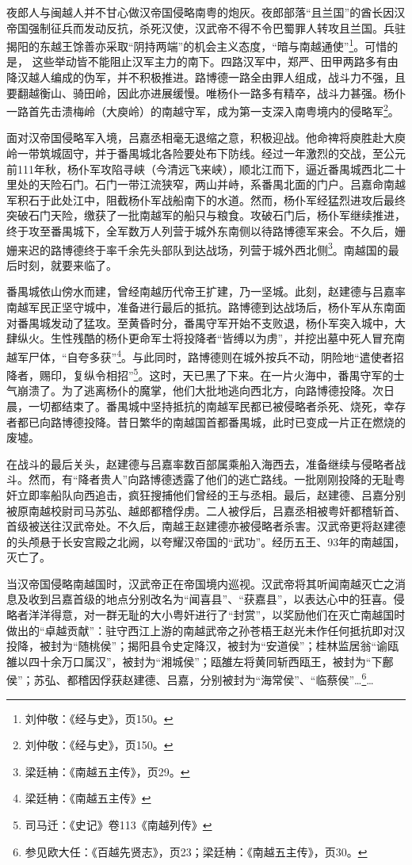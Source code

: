 夜郎人与闽越人并不甘心做汉帝国侵略南粤的炮灰。夜郎部落“且兰国”的酋长因汉帝国强制征兵而发动反抗，杀死汉使，汉武帝不得不令巴蜀罪人转攻且兰国。兵驻揭阳的东越王馀善亦采取“阴持两端”的机会主义态度，“暗与南越通使”\footnote{刘仲敬：《经与史》，页150。}。可惜的是， 这些举动皆不能阻止汉军主力的南下。四路汉军中，郑严、田甲两路多有由降汉越人编成的伪军，并不积极推进。路博德一路全由罪人组成，战斗力不强，且要翻越衡山、骑田岭，因此亦进展缓慢。唯杨仆一路多有精卒，战斗力甚强。杨仆一路首先击溃梅岭（大庾岭）的南越守军，成为第一支深入南粤境内的侵略军\footnote{刘仲敬：《经与史》，页150。}。

面对汉帝国侵略军入境，吕嘉丞相毫无退缩之意，积极迎战。他命禆将庾胜赴大庾岭一带筑城固守，并于番禺城北各险要处布下防线。经过一年激烈的交战，至公元前111年秋，杨仆军攻陷寻峡（今清远飞来峡），顺北江而下，逼近番禺城西北二十里处的天险石门。石门一带江流狭窄，两山并峙，系番禺北面的门户。吕嘉命南越军积石于此处江中，阻截杨仆军战船南下的水道。然而，杨仆军经猛烈进攻后最终突破石门天险，缴获了一批南越军的船只与粮食。攻破石门后，杨仆军继续推进，终于攻至番禺城下，全军数万人列营于城外东南侧以待路博德军来会。不久后，姗姗来迟的路博德终于率千余先头部队到达战场，列营于城外西北侧\footnote{梁廷柟：《南越五主传》，页29。}。南越国的最后时刻，就要来临了。

番禺城依山傍水而建，曾经南越历代帝王扩建，乃一坚城。此刻，赵建德与吕嘉率南越军民正坚守城中，准备进行最后的抵抗。路博德到达战场后，杨仆军从东南面对番禺城发动了猛攻。至黄昏时分，番禺守军开始不支败退，杨仆军突入城中，大肆纵火。生性残酷的杨仆更命军士将投降者“皆缚以为虏”，并挖出墓中死人冒充南越军尸体，“自夸多获”\footnote{梁廷柟：《南越五主传》}。与此同时，路博德则在城外按兵不动，阴险地“遣使者招降者，赐印，复纵令相招”\footnote{司马迁：《史记》卷113《南越列传》}。这时，天已黑了下来。在一片火海中，番禺守军的士气崩溃了。为了逃离杨仆的魔掌，他们大批地逃向西北方，向路博德投降。次日晨，一切都结束了。番禺城中坚持抵抗的南越军民都已被侵略者杀死、烧死，幸存者都已向路博德投降。昔日繁华的南越国首都番禺城，此时已变成一片正在燃烧的废墟。

在战斗的最后关头，赵建德与吕嘉率数百部属乘船入海西去，准备继续与侵略者战斗。然而，有“降者贵人”向路博德透露了他们的逃亡路线。一批刚刚投降的无耻粤奸立即率船队向西追击，疯狂搜捕他们曾经的王与丞相。最后，赵建德、吕嘉分别被原南越校尉司马苏弘、越郎都稽俘虏。二人被俘后，吕嘉丞相被粤奸都稽斩首、首级被送往汉武帝处。不久后，南越王赵建德亦被侵略者杀害。汉武帝更将赵建德的头颅悬于长安宫殿之北阙，以夸耀汉帝国的“武功”。经历五王、93年的南越国，灭亡了。

当汉帝国侵略南越国时，汉武帝正在帝国境内巡视。汉武帝将其听闻南越灭亡之消息及收到吕嘉首级的地点分别改名为“闻喜县”、“获嘉县”，以表达心中的狂喜。侵略者洋洋得意，对一群无耻的大小粤奸进行了“封赏”，以奖励他们在灭亡南越国时做出的“卓越贡献”：驻守西江上游的南越武帝之孙苍梧王赵光未作任何抵抗即对汉投降，被封为“随桃侯”；揭阳县令史定降汉，被封为“安道侯”；桂林监居翁“谕瓯雒以四十余万口属汉”，被封为“湘城侯”；瓯雒左将黄同斩西瓯王，被封为“下鄜侯”；苏弘、都稽因俘获赵建德、吕嘉，分别被封为“海常侯”、“临蔡侯”…\footnote{参见欧大任：《百越先贤志》，页23；梁廷柟：《南越五主传》，页30。}…

